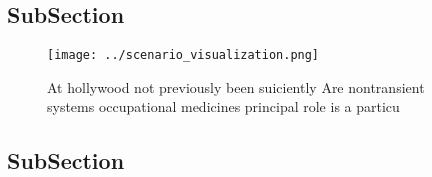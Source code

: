 \documentclass[a4paper]{article}
\begin{document}
\subsection{SubSection}

\begin{figure}
\centering
\texttt{[image: ../scenario\_visualization.png]}
\caption{At hollywood not previously been suiciently Are nontransient systems occupational medicines principal role is a particu
}
\end{figure}
 
\subsection{SubSection}
\end{document}
